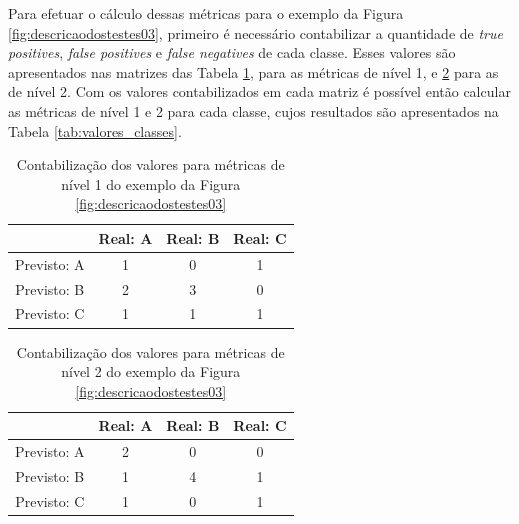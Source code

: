 Para efetuar o cálculo dessas métricas para o exemplo da Figura \ref{fig:descricaodostestes03}, primeiro é necessário contabilizar a quantidade de \textit{true positives}, \textit{false positives} e \textit{false negatives} de cada classe.
Esses valores são apresentados nas matrizes das Tabela \ref{tab:confusao1}, para as métricas de nível 1, e \ref{tab:confusao2} para as de nível 2.
Com os valores contabilizados em cada matriz é possível então calcular as métricas de nível 1 e 2 para cada classe, cujos resultados são apresentados na Tabela \ref{tab:valores_classes}.

\begin{table}[h!]
  \begin{center}
    \begin{tabular}{cccc}
      \hline
         & \textbf{Real: A} & \textbf{Real: B} & \textbf{Real: C} \\
      \hline

      Previsto: A & 1 & 0 & 1\\
      Previsto: B & 2 & 3 & 0\\
      Previsto: C & 1 & 1 & 1\\

      \hline
    \end{tabular}
    \caption{Contabilização dos valores para métricas de nível 1 do exemplo da Figura \ref{fig:descricaodostestes03}}
    \label{tab:confusao1}
  \end{center}
\end{table}

\begin{table}[h!]
  \begin{center}
    \begin{tabular}{cccc}
      \hline
         & \textbf{Real: A} & \textbf{Real: B} & \textbf{Real: C} \\
      \hline

      Previsto: A & 2 & 0 & 0\\
      Previsto: B & 1 & 4 & 1\\
      Previsto: C & 1 & 0 & 1\\

      \hline
    \end{tabular}
    \caption{Contabilização dos valores para métricas de nível 2 do exemplo da Figura \ref{fig:descricaodostestes03}}
    \label{tab:confusao2}
  \end{center}
\end{table}

